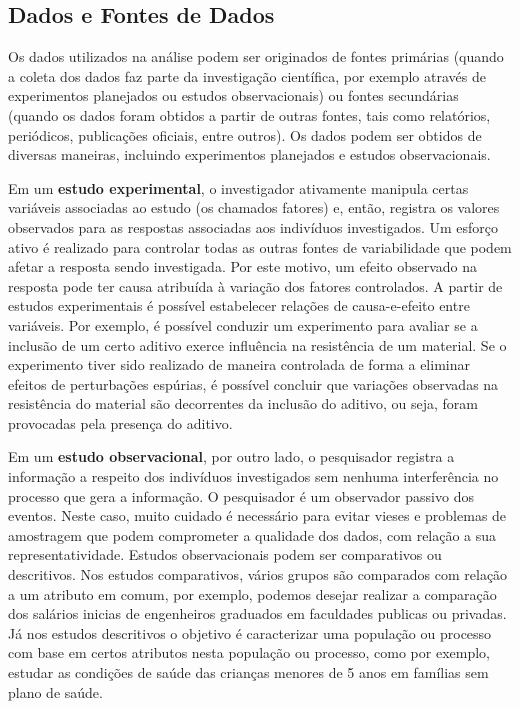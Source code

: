 \documentclass[
]{book}
\theoremstyle{definition}
\theoremstyle{definition}
\theoremstyle{definition}
\theoremstyle{remark}
\begin{document}
\hypertarget{dados-e-fontes-de-dados}{%
\subsection*{Dados e Fontes de Dados}\label{dados-e-fontes-de-dados}}

Os dados utilizados na análise podem ser originados de fontes primárias (quando a coleta dos dados faz parte da investigação científica, por exemplo através de experimentos planejados ou estudos observacionais) ou fontes secundárias (quando os dados foram obtidos a partir de outras fontes, tais como relatórios, periódicos, publicações oficiais, entre outros). Os dados podem ser obtidos de diversas maneiras, incluindo experimentos planejados e estudos observacionais.

Em um \textbf{estudo experimental}, o investigador ativamente manipula certas variáveis associadas ao estudo (os chamados fatores) e, então, registra os valores observados para as respostas associadas aos indivíduos investigados. Um esforço ativo é realizado para controlar todas as outras fontes de variabilidade que podem afetar a resposta sendo investigada. Por este motivo, um efeito observado na resposta pode ter causa atribuída à variação dos fatores controlados. A partir de estudos experimentais é possível estabelecer relações de causa-e-efeito entre variáveis. Por exemplo, é possível conduzir um experimento para avaliar se a inclusão de um certo aditivo exerce influência na resistência de um material. Se o experimento tiver sido realizado de maneira controlada de forma a eliminar efeitos de perturbações espúrias, é possível concluir que variações observadas na resistência do material são decorrentes da inclusão do aditivo, ou seja, foram provocadas pela presença do aditivo.

Em um \textbf{estudo observacional}, por outro lado, o pesquisador registra a informação a respeito dos indivíduos investigados sem nenhuma interferência no processo que gera a informação. O pesquisador é um observador passivo dos eventos. Neste caso, muito cuidado é necessário para evitar vieses e problemas de amostragem que podem comprometer a qualidade dos dados, com relação a sua representatividade. Estudos observacionais podem ser comparativos ou descritivos. Nos estudos comparativos, vários grupos são comparados com relação a um atributo em comum, por exemplo, podemos desejar realizar a comparação dos salários inicias de engenheiros graduados em faculdades publicas ou privadas. Já nos estudos descritivos o objetivo é caracterizar uma população ou processo com base em certos atributos nesta população ou processo, como por exemplo, estudar as condições de saúde das crianças menores de 5 anos em famílias sem plano de saúde.
\end{document}
